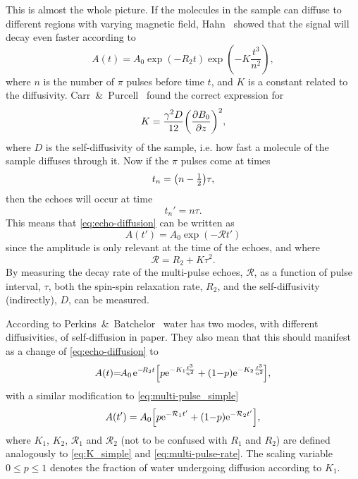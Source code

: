 \documentclass[11pt,a4paper, twocolumn,
swedish, english %
]{article}
\begin{document}
This is almost the whole picture. If the molecules in the sample can
diffuse to different regions with varying magnetic field,
Hahn~\cite{Hahn1950} showed that the signal will decay even faster
according to
\begin{equation}\label{eq:echo-diffusion}
A(t)=A_0\exp(-R_2t)
\exp(-K\frac{t^3}{n^2}),
\end{equation}
where $n$ is the number of $\pi$ pulses before time $t$, and $K$ is a
constant related to the diffusivity. Carr~\&~Purcell~\cite{Carr-Purcell1954} found the correct expression for
\begin{equation}\label{eq:K_simple}
K=\frac{\gamma^2D}{12}\qty(\pdv{B_0}{z})^2,
\end{equation}
where $D$ is the self-diffusivity of the sample, i.e. how fast a
molecule of the sample diffuses through it. Now if the $\pi$ pulses
come at times
\begin{equation}
t_{n}=\qty(n-\tfrac{1}{2})\tau,
\end{equation}
then the echoes will occur at time 
\begin{equation}
t_n'=n\tau.
\end{equation}
This means that \eqref{eq:echo-diffusion} can be written as
\begin{equation}\label{eq:multi-pulse_simple}
A(t')=A_0\exp(-\mathcal{R}t')
\end{equation}
since the amplitude is only relevant at the time of the echoes, and
where 
\begin{equation}\label{eq:multi-pulse-rate}
\mathcal{R}=R_2+K\tau^2.
\end{equation}
By measuring the decay rate of the multi-pulse echoes, $\mathcal{R}$,
as a function of pulse interval, $\tau$, both the spin-spin relaxation
rate, $R_2$, and the self-diffusivity (indirectly), $D$, can be measured.

According to Perkins~\&~Batchelor~\cite{Perkins-Batchelor2012} water
has two modes, with different diffusivities, of self-diffusion in
paper. They also mean that this should manifest as a change of
\eqref{eq:echo-diffusion} to
\begin{equation}
\begin{aligned}
A(t){=}\hspace{-1pt}A_0\hspace{1pt}
\mathrm{e}^{{-}\!R_2t}\qty[
p\mathrm{e}^{{-}K_1\!\frac{t^3}{n^2}} + (1{-}p)\mathrm{e}^{{-}K_2\frac{t^3}{n^2}}
\!],
\end{aligned}
\end{equation}
with a similar modification to \eqref{eq:multi-pulse_simple}
\begin{equation}\label{eq:multi-pulse_dual}
A(t')=A_0\qty[p\mathrm{e}^{-\mathcal{R}_1t'}+
(1{-}p)\mathrm{e}^{-\mathcal{R}_2t'}],
\end{equation}
where $K_1$, $K_2$, $\mathcal{R}_1$ and $\mathcal{R}_2$ (not to be
confused with $R_1$ and $R_2$) are defined analogously to
\eqref{eq:K_simple} and \eqref{eq:multi-pulse-rate}. The
scaling variable $0\le p\le1$ denotes the fraction of water undergoing
diffusion according to $K_1$. 
\end{document}
